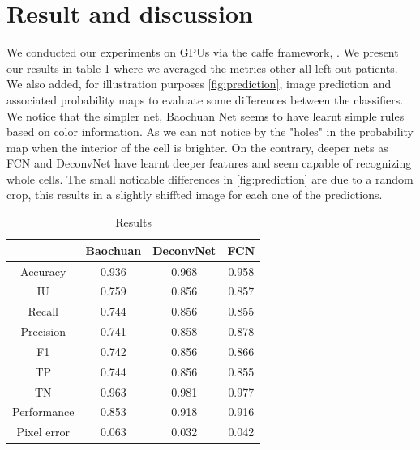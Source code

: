 \documentclass{article}
\begin{document}
\section{Result and discussion}
\label{sec:result}
We conducted our experiments on GPUs via the caffe framework, \cite{jia2014caffe}. We present our results in table \ref{tab:res} where we averaged the metrics other all left out patients. We also added, for illustration purposes \ref{fig:prediction}, image prediction and associated probability maps to evaluate some differences between the classifiers. We notice that the simpler net, Baochuan Net seems to have learnt simple rules based on color information. As we can not notice by the "holes" in the probability map when the interior of the cell is brighter. On the contrary, deeper nets as FCN and DeconvNet have learnt deeper features and seem capable of recognizing whole cells. The small noticable differences in \ref{fig:prediction} are due to a random crop, this results in a slightly shiffted image for each one of the predictions.
\begin{table}
\begin{tabular}{|c|c|c|c|}
\hline
  & Baochuan & DeconvNet & FCN \\
 \hline
Accuracy  &       0.936 & 0.968 &0.958  \\
IU   &    0.759 &     0.856 & 0.857 \\
Recall     &       0.744  &     0.856 & 0.855 \\
Precision   &       0.741 &     0.858 & 0.878\\
F1    &       0.742 &     0.856 & 0.866 \\
TP       &       0.744 &     0.856 & 0.855  \\
TN      &       0.963 &     0.981 &  0.977\\
Performance    &       0.853 &     0.918 & 0.916\\
Pixel error  &  0.063 &     0.032 & 0.042\\
\hline
\end{tabular}
\caption{\label{tab:res}Results}
\label{tab:res}
\end{table}
\end{document}
